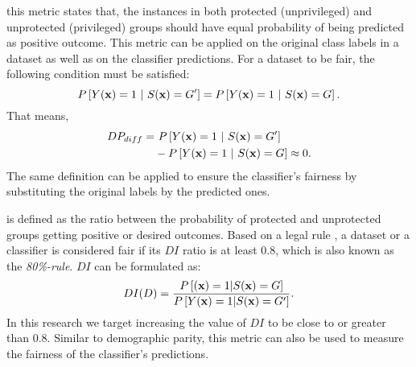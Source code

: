  this metric states that, the instances in both protected (unprivileged) and unprotected (privileged) groups should have equal probability of being predicted as positive outcome. This metric can be applied on the original class labels in a dataset as well as on the classifier predictions. For a dataset to be fair, the following condition must be satisfied:
\[P\left[Y({\bf x})=1\ |\ S({\bf x})=G' \right]  = P\left[Y({\bf x})=1\ |\ S({\bf x}) = G \right].\] That means, 
\begin{align} \label{eq:DPDiff}
\begin{split}
DP_{diff} = &\ P\left[Y({\bf x})=1\ |\ S({\bf x})=G' \right]
    \\& - P\left[ {Y({\bf x})}=1\ |\ S({\bf x}) = G \right] \approx 0.
\end{split}
\end{align}
The same definition can be applied to ensure the classifier's fairness by substituting the original labels by the predicted ones.%

 is defined as the ratio between the probability of protected and unprotected groups getting positive or desired outcomes. Based on a legal rule \cite{US_guideline}, a dataset or a classifier is considered fair if its $DI$ ratio is at least 0.8, which is also known as the \emph{80\%-rule}. $DI$ can be formulated as:
\begin{equation}\label{eq:di}
DI(D) = \frac{ P\left[({\bf x}) = 1 | S({\bf x}) = G\right]} {P\left[Y({\bf x}) = 1 | S({\bf x})=G'\right]}.
\end{equation}
In this research we target increasing the value of $DI$ to be close to or greater than $0.8$. Similar to demographic parity, this metric can also be used to measure the fairness of the classifier's predictions.


